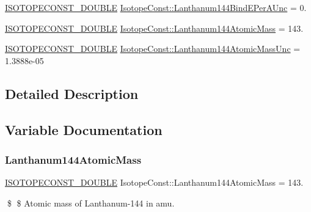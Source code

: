 \begin{DoxyCompactItemize}
\mbox{\hyperlink{group___isotope_const-_macros_ga8f45a7272ce02c0b4c65c44636ed719a}{I\+S\+O\+T\+O\+P\+E\+C\+O\+N\+S\+T\+\_\+\+D\+O\+U\+B\+LE}} \mbox{\hyperlink{group___isotope_const-_lanthanum-_la144_ga93afcd6272f37ac348a56b97b8c175b6}{Isotope\+Const\+::\+Lanthanum144\+Bind\+E\+Per\+A\+Unc}} = 0.
\item 
\mbox{\hyperlink{group___isotope_const-_macros_ga8f45a7272ce02c0b4c65c44636ed719a}{I\+S\+O\+T\+O\+P\+E\+C\+O\+N\+S\+T\+\_\+\+D\+O\+U\+B\+LE}} \mbox{\hyperlink{group___isotope_const-_lanthanum-_la144_ga0e906e923697fd3d0bf634b5abbe90e0}{Isotope\+Const\+::\+Lanthanum144\+Atomic\+Mass}} = 143.
\item 
\mbox{\hyperlink{group___isotope_const-_macros_ga8f45a7272ce02c0b4c65c44636ed719a}{I\+S\+O\+T\+O\+P\+E\+C\+O\+N\+S\+T\+\_\+\+D\+O\+U\+B\+LE}} \mbox{\hyperlink{group___isotope_const-_lanthanum-_la144_ga8964db252e5c2b5872ad0884c94f55a3}{Isotope\+Const\+::\+Lanthanum144\+Atomic\+Mass\+Unc}} = 1.\+3888e-\/05
\end{DoxyCompactItemize}


\subsection{Detailed Description}


\subsection{Variable Documentation}
\mbox{\label{group___isotope_const-_lanthanum-_la144_ga0e906e923697fd3d0bf634b5abbe90e0}} 
\subsubsection{\texorpdfstring{Lanthanum144\+Atomic\+Mass}{Lanthanum144AtomicMass}}
{\footnotesize\ttfamily \mbox{\hyperlink{group___isotope_const-_macros_ga8f45a7272ce02c0b4c65c44636ed719a}{I\+S\+O\+T\+O\+P\+E\+C\+O\+N\+S\+T\+\_\+\+D\+O\+U\+B\+LE}} Isotope\+Const\+::\+Lanthanum144\+Atomic\+Mass = 143.}

\$ \$ Atomic mass of Lanthanum-\/144 in amu. \mbox{\label{group___isotope_const-_lanthanum-_la144_ga8964db252e5c2b5872ad0884c94f55a3}} 

